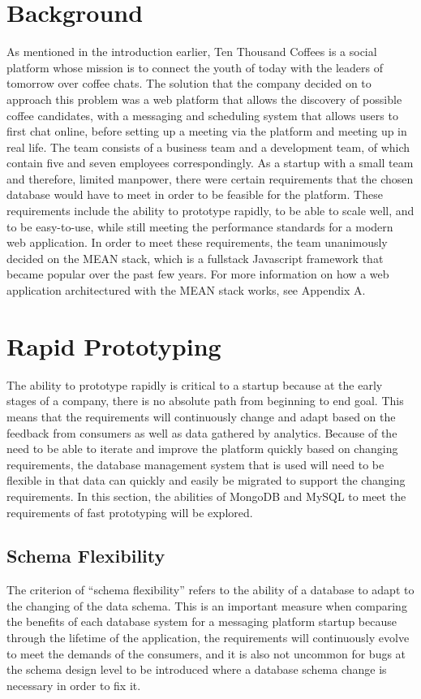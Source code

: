 \documentclass[12pt]{article}
\begin{document}
\section{Background}
As mentioned in the introduction earlier, Ten Thousand Coffees is a social platform whose mission is to connect the youth of today with the leaders of tomorrow over coffee chats. The solution that the company decided on to approach this problem was a web platform that allows the discovery of possible coffee candidates, with a messaging and scheduling system that allows users to first chat online, before setting up a meeting via the platform and meeting up in real life. The team consists of a business team and a development team, of which contain five and seven employees correspondingly. As a startup with a small team and therefore, limited manpower, there were certain requirements that the chosen database would have to meet in order to be feasible for the platform. These requirements include the ability to prototype rapidly, to be able to scale well, and to be easy-to-use, while still meeting the performance standards for a modern web application. In order to meet these requirements, the team unanimously decided on the MEAN stack, which is a fullstack Javascript framework that became popular over the past few years. For more information on how a web application architectured with the MEAN stack works, see Appendix A.

\section{Rapid Prototyping}
The ability to prototype rapidly is critical to a startup because at the early stages of a company, there is no absolute path from beginning to end goal. This means that the requirements will continuously change and adapt based on the feedback from consumers as well as data gathered by analytics. Because of the need to be able to iterate and improve the platform quickly based on changing requirements, the database management system that is used will need to be flexible in that data can quickly and easily be migrated to support the changing requirements. In this section, the abilities of MongoDB and MySQL to meet the requirements of fast prototyping will be explored.

\subsection{Schema Flexibility}
The criterion of ``schema flexibility'' refers to the ability of a database to adapt to the changing of the data schema. This is an important measure when comparing the benefits of each database system for a messaging platform startup because through the lifetime of the application, the requirements will continuously evolve to meet the demands of the consumers, and it is also not uncommon for bugs at the schema design level to be introduced where a database schema change is necessary in order to fix it.
\end{document}
